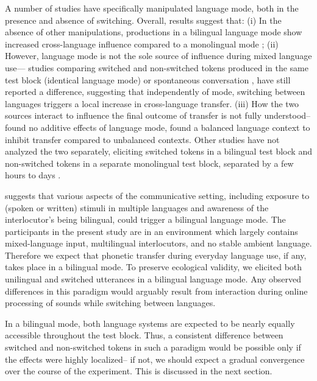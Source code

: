 \documentclass[12 pt]{article}
\begin{document}
A number of studies have specifically manipulated language mode, both in the presence and absence of switching. Overall, results suggest that: (i) In the absence of other manipulations, productions in a bilingual language mode show increased cross-language influence compared to a monolingual mode \citep{simonet2020increased,simonet2014phonetic}; (ii) However, language mode is not the sole source of influence during mixed language use--- studies comparing switched and non-switched tokens produced in the same test block (identical language mode) \citep{olson2016role,tsui2019impact} or spontaneous conversation \citep{piccinini2015voice}, have still reported a difference, suggesting that independently of mode, switching between languages triggers a local increase in cross-language transfer. (iii) How the two sources interact to influence the final outcome of transfer is not fully understood-- \cite{olson2016role} found no additive effects of language mode, \cite{olson2013bilingual} found a balanced language context to inhibit transfer compared to unbalanced contexts.  Other studies have not analyzed the two separately, eliciting switched tokens in a bilingual test block and non-switched tokens in a separate monolingual test block, separated by a few hours to days \citep{schwartz2015language, bullock2009trying,antoniou2011inter, elias2017effects,vsimavckova2015immediate,vsimavckova2018patterns}.

\cite{grosjean1998studying} suggests that various aspects of the communicative setting, including exposure to (spoken or written) stimuli in multiple languages and awareness of the interlocutor's being bilingual, could trigger a bilingual language mode. The participants in the present study are in an environment which largely contains mixed-language input, multilingual interlocutors, and no stable ambient language. Therefore we expect that phonetic transfer during everyday language use, if any, takes place in a bilingual mode.  To preserve ecological validity, we elicited both unilingual and switched utterances in a bilingual language mode. Any observed differences in this paradigm would arguably result from interaction during online processing of sounds while switching between languages. 

In a bilingual mode, both language systems are expected to be nearly equally accessible throughout the test block. Thus, a consistent difference between switched and non-switched tokens in such a paradigm would be possible only if the effects were highly localized-- if not, we should expect a gradual convergence over the course of the experiment. This is discussed in the next section.
\end{document}

